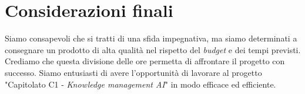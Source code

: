 \section{Considerazioni finali}

Siamo consapevoli che si tratti di una sfida impegnativa, ma siamo determinati a
consegnare un prodotto di alta qualità nel rispetto del \textit{budget} e dei tempi
previsti. \\
Crediamo che questa divisione delle ore permetta di affrontare il
progetto con successo. Siamo entusiasti di avere l'opportunità di lavorare al
progetto "Capitolato C1 - \textit{Knowledge management AI}" in modo efficace ed
efficiente.
